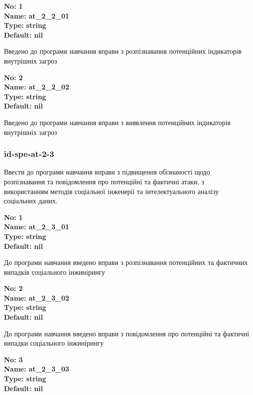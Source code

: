 \documentclass{article}
\begin{document}
\vspace{10pt}
{\footnotesize\bfseries
No: 1\\
Name: at\_\allowbreak{}2\_\allowbreak{}2\_\allowbreak{}01\\
Type: string\\
Default: nil
}

{\footnotesize Введено до програми навчання вправи з розпізнавання потенційних індикаторів внутрішніх загроз}


{\footnotesize\bfseries
No: 2\\
Name: at\_\allowbreak{}2\_\allowbreak{}2\_\allowbreak{}02\\
Type: string\\
Default: nil
}

{\footnotesize Введено до програми навчання вправи з виявлення потенційних індикаторів внутрішніх загроз}




\subsubsection{id-spe-at-2-3}
Ввести до програми навчання вправи з підвищення обізнаності щодо розпізнавання та повідомлення про потенційні та фактичні атаки, з використанням методів соціальної інженерії та інтелектуального аналізу соціальних даних.

\vspace{10pt}
{\footnotesize\bfseries
No: 1\\
Name: at\_\allowbreak{}2\_\allowbreak{}3\_\allowbreak{}01\\
Type: string\\
Default: nil
}

{\footnotesize До програми навчання введено вправи з розпізнавання потенційних та фактичних випадків соціального інжинірингу}


{\footnotesize\bfseries
No: 2\\
Name: at\_\allowbreak{}2\_\allowbreak{}3\_\allowbreak{}02\\
Type: string\\
Default: nil
}

{\footnotesize До програми навчання введено вправи з повідомлення про потенційні та фактичні випадки соціального інжинірингу}


{\footnotesize\bfseries
No: 3\\
Name: at\_\allowbreak{}2\_\allowbreak{}3\_\allowbreak{}03\\
Type: string\\
Default: nil
}
\end{document}
